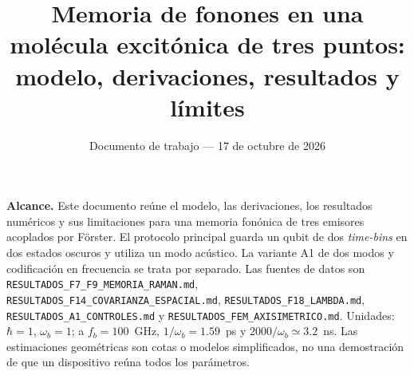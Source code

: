 \documentclass[11pt,a4paper]{article}
\title{Memoria de fonones en una molécula excitónica de tres puntos:\\ modelo, derivaciones, resultados y límites}
\author{}
\date{Documento de trabajo --- 17 de octubre de 2026}
\newcommand{\wb}{\omega_b}
\begin{document}
\maketitle

\noindent\textbf{Alcance.} Este documento reúne el modelo, las derivaciones, los resultados numéricos y sus
limitaciones para una memoria fonónica de tres emisores acoplados por Förster. El protocolo principal guarda
un qubit de dos \emph{time-bins} en dos estados oscuros y utiliza un modo acústico. La variante A1 de dos
modos y codificación en frecuencia se trata por separado. Las fuentes de datos son
\texttt{RESULTADOS\_F7\_F9\_MEMORIA\_RAMAN.md},
\texttt{RESULTADOS\_F14\_COVARIANZA\_ESPACIAL.md},
\texttt{RESULTADOS\_F18\_LAMBDA.md}, \texttt{RESULTADOS\_A1\_CONTROLES.md} y \texttt{RESULTADOS\_FEM\_AXISIMETRICO.md}.
Unidades: $\hbar=1$, $\wb=1$; a $f_b=100$~GHz, $1/\wb=1.59$~ps y $2000/\wb\simeq 3.2$~ns.
Las estimaciones geométricas son cotas o modelos simplificados, no una demostración de que un dispositivo
reúna todos los parámetros.

\end{document}

